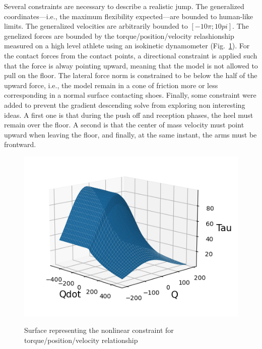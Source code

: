 
Several constraints are necessary to describe a realistic jump.
The generalized coordinates---i.e., the maximum flexibility expected---are bounded to human-like limits.
The generalized velocities are arbitrarily bounded to $[-10 \pi; 10 pi]$.
The genelized forces are bounded by the torque/position/velocity relashionship measured on a high level athlete using an isokinetic dynamometer (Fig.~\ref{fig:graph_force_vitesse_longueur}). 
For the contact forces from the contact points, a directional constraint is applied such that the force is alway pointing upward, meaning that the model is not allowed to pull on the floor. 
The lateral force norm is constrained to be below the half of the upward force, i.e., the model remain in a cone of friction more or less corresponding in a normal surface contacting shoes. 
Finally, some constraint were added to prevent the gradient descending solve from exploring non interesting ideas. 
A first one is that during the push off and reception phases, the heel must remain over the floor.
A second is that the center of mass velocity must point upward when leaving the floor, and finally, at the same instant, the arms must be frontward. 

\begin{figure}[h!]
\includegraphics[width=\columnwidth]{figures/graph_force_vitesse_longueur.png}\\
\caption{Surface representing the nonlinear constraint for torque/position/velocity relationship}
\label{fig:graph_force_vitesse_longueur}
\end{figure}


